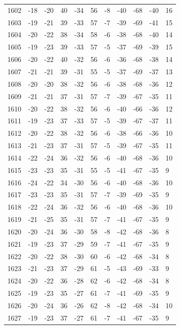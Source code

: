 \begin{table}[H]
\begin{tabular}{lllllllllll}
1602 & -18 & -20 & 40 & -34 & 56 & -8 & -40 & -68 & -40 & 16 \\
1603 & -19 & -21 & 39 & -33 & 57 & -7 & -39 & -69 & -41 & 15 \\
1604 & -20 & -22 & 38 & -34 & 58 & -6 & -38 & -68 & -40 & 14 \\
1605 & -19 & -23 & 39 & -33 & 57 & -5 & -37 & -69 & -39 & 15 \\
1606 & -20 & -22 & 40 & -32 & 56 & -6 & -36 & -68 & -38 & 14 \\
1607 & -21 & -21 & 39 & -31 & 55 & -5 & -37 & -69 & -37 & 13 \\
1608 & -20 & -20 & 38 & -32 & 56 & -6 & -38 & -68 & -36 & 12 \\
1609 & -21 & -21 & 37 & -31 & 57 & -7 & -39 & -67 & -35 & 11 \\
1610 & -20 & -22 & 38 & -32 & 56 & -6 & -40 & -66 & -36 & 12 \\
1611 & -19 & -23 & 37 & -33 & 57 & -5 & -39 & -67 & -37 & 11 \\
1612 & -20 & -22 & 38 & -32 & 56 & -6 & -38 & -66 & -36 & 10 \\
1613 & -21 & -23 & 37 & -31 & 57 & -5 & -39 & -67 & -35 & 11 \\
1614 & -22 & -24 & 36 & -32 & 56 & -6 & -40 & -68 & -36 & 10 \\
1615 & -23 & -23 & 35 & -31 & 55 & -5 & -41 & -67 & -35 & 9 \\
1616 & -24 & -22 & 34 & -30 & 56 & -6 & -40 & -68 & -36 & 10 \\
1617 & -23 & -23 & 35 & -31 & 57 & -7 & -39 & -69 & -35 & 9 \\
1618 & -22 & -24 & 36 & -32 & 56 & -6 & -40 & -68 & -36 & 10 \\
1619 & -21 & -25 & 35 & -31 & 57 & -7 & -41 & -67 & -35 & 9 \\
1620 & -20 & -24 & 36 & -30 & 58 & -8 & -42 & -68 & -36 & 8 \\
1621 & -19 & -23 & 37 & -29 & 59 & -7 & -41 & -67 & -35 & 9 \\
1622 & -20 & -22 & 38 & -30 & 60 & -6 & -42 & -68 & -34 & 8 \\
1623 & -21 & -23 & 37 & -29 & 61 & -5 & -43 & -69 & -33 & 9 \\
1624 & -20 & -22 & 36 & -28 & 62 & -6 & -42 & -68 & -34 & 8 \\
1625 & -19 & -23 & 35 & -27 & 61 & -7 & -41 & -69 & -35 & 9 \\
1626 & -20 & -24 & 36 & -26 & 62 & -8 & -42 & -68 & -34 & 10 \\
1627 & -19 & -23 & 37 & -27 & 61 & -7 & -41 & -67 & -35 & 9 \\

\end{tabular}
\end{table}
